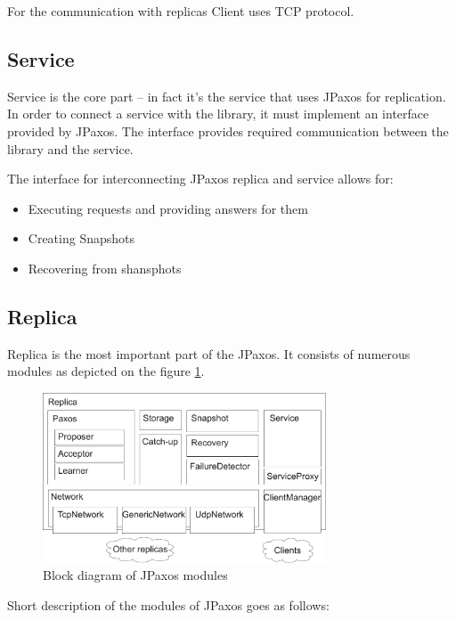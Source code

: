 For the communication with replicas Client uses TCP protocol.

\subsection{Service}

Service is the core part -- in fact it's the service that uses JPaxos for replication.
In order to connect a service with the library, it must implement an interface provided by JPaxos. The interface provides required communication between the library and the service.

The interface for interconnecting JPaxos replica and service allows for:
\begin{itemize}
 \item Executing requests and providing answers for them
 \item Creating Snapshots
 \item Recovering from shansphots
\end{itemize}

\subsection{Replica}

Replica is the most important part of the JPaxos. It consists of numerous modules as depicted on the figure \ref{fig:replica_architecture}.

\begin{figure}[h]
 \centering
 \includegraphics[keepaspectratio, width=0.75\textwidth]{architecture/replica_architecture.pdf}
 \caption{Block diagram of JPaxos modules}
 \label{fig:replica_architecture}
\end{figure}

Short description of the modules of JPaxos goes as follows:

